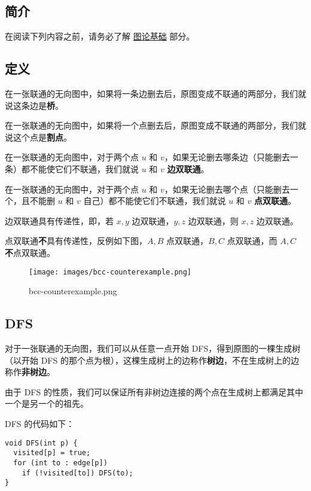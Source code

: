 
\subsection{简介}

在阅读下列内容之前，请务必了解 \href{/graph/basic}{图论基础} 部分。

\subsection{定义}

在一张联通的无向图中，如果将一条边删去后，原图变成不联通的两部分，我们就说这条边是\textbf{桥}。

在一张联通的无向图中，如果将一个点删去后，原图变成不联通的两部分，我们就说这个点是\textbf{割点}。

在一张联通的无向图中，对于两个点 $u$ 和 $v$，如果无论删去哪条边（只能删去一条）都不能使它们不联通，我们就说 $u$ 和 $v$ \textbf{边双联通}。

在一张联通的无向图中，对于两个点 $u$ 和 $v$，如果无论删去哪个点（只能删去一个，且不能删 $u$ 和 $v$ 自己）都不能使它们不联通，我们就说 $u$ 和 $v$ \textbf{点双联通}。

边双联通具有传递性，即，若 $x,y$ 边双联通，$y,z$ 边双联通，则 $x,z$ 边双联通。

点双联通\textbf{不}具有传递性，反例如下图，$A,B$ 点双联通，$B,C$ 点双联通，而 $A,C$ \textbf{不}点双联通。

\begin{figure}[h]
\centering
\texttt{[image: images/bcc-counterexample.png]} 
\caption{bcc-counterexample.png}
\end{figure}

\subsection{DFS}

对于一张联通的无向图，我们可以从任意一点开始 DFS，得到原图的一棵生成树（以开始 DFS 的那个点为根），这棵生成树上的边称作\textbf{树边}，不在生成树上的边称作\textbf{非树边}。

由于 DFS 的性质，我们可以保证所有非树边连接的两个点在生成树上都满足其中一个是另一个的祖先。

DFS 的代码如下：

\begin{verbatim}
void DFS(int p) {
  visited[p] = true;
  for (int to : edge[p])
    if (!visited[to]) DFS(to);
}
\end{verbatim}

